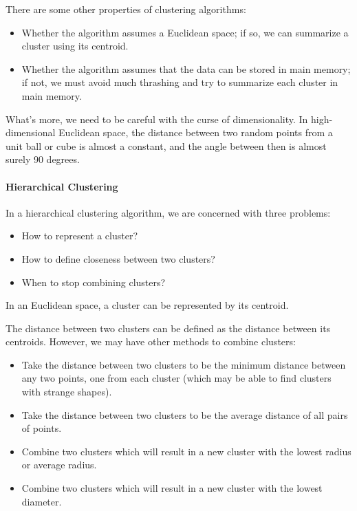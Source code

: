 \documentclass{article}
\begin{document}
There are some other properties of clustering algorithms:
\begin{itemize}
\item Whether the algorithm assumes a Euclidean space; if so, we can summarize a cluster using its centroid.
\item Whether the algorithm assumes that the data can be stored in main memory; if not, we must avoid much thrashing and try to summarize each cluster in main memory.
\end{itemize}

What's more, we need to be careful with the curse of dimensionality. In high-dimensional Euclidean space, the distance between two random points from a unit ball or cube is almost a constant, and the angle between then is almost surely 90 degrees.

\paragraph{Hierarchical Clustering}
In a hierarchical clustering algorithm, we are concerned with three problems:
\begin{itemize}
\item How to represent a cluster?
\item How to define closeness between two clusters?
\item When to stop combining clusters?
\end{itemize}
In an Euclidean space, a cluster can be represented by its centroid. 

The distance between two clusters can be defined as the distance between its centroids. However, we may have other methods to combine clusters:
\begin{itemize}
\item Take the distance between two clusters to be the minimum distance between any two points, one from each cluster (which may be able to find clusters with strange shapes).
\item Take the distance between two clusters to be the average distance of all pairs of points.
\item Combine two clusters which will result in a new cluster with the lowest radius or average radius.
\item Combine two clusters which will result in a new cluster with the lowest diameter.
\end{itemize}
\end{document}
